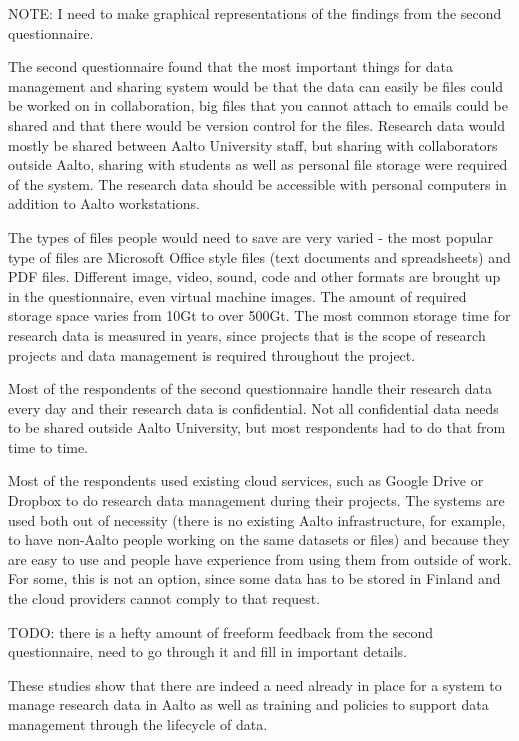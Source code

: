 NOTE: I need to make graphical representations of the findings from the
second questionnaire.

The second questionnaire found that the most important things for data
management and sharing system would be that the data can easily be files
could be worked on in collaboration, big files that you cannot attach to
emails could be shared and that there would be version control for the files.
Research data would mostly be shared between Aalto University staff, but
sharing with collaborators outside Aalto, sharing with students as well as
personal file storage were required of the system. The research data should be
accessible with personal computers in addition to Aalto workstations.

The types of files people would need to save are very varied - the most
popular type of files are Microsoft Office style files (text documents and
spreadsheets) and PDF files. Different image, video, sound, code and other
formats are brought up in the questionnaire, even virtual machine images.
The amount of required storage space varies from 10Gt to over 500Gt. The most
common storage time for research data is measured in years, since projects that
is the scope of research projects and data management is required throughout
the project.

Most of the respondents of the second questionnaire handle their research data
every day and their research data is confidential. Not all confidential data
needs to be shared outside Aalto University, but most respondents had to do
that from time to time.

Most of the respondents used existing cloud services, such as Google Drive or
Dropbox to do research data management during their projects. The systems are
used both out of necessity (there is no existing Aalto infrastructure, for
example, to have non-Aalto people working on the same datasets or files) and
because they are easy to use and people have experience from using them from
outside of work. For some, this is not an option, since some data has to be
stored in Finland and the cloud providers cannot comply to that request.

TODO: there is a hefty amount of freeform feedback from the second
questionnaire, need to go through it and fill in important details.

These studies show that there are indeed a need already in place for a system to
manage research data in Aalto as well as training and policies to support data
management through the lifecycle of data.

